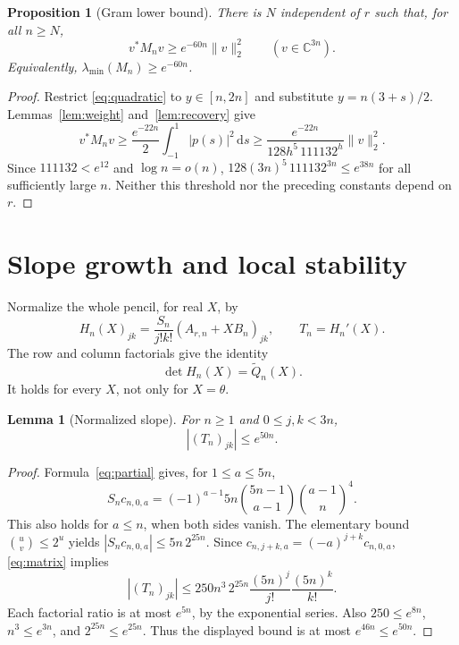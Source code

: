 \documentclass[11pt]{article}
\newtheorem{lemma}[theorem]{Lemma}
\newtheorem{proposition}[theorem]{Proposition}
\numberwithin{equation}{section}
\newcommand{\C}{\mathbb C}
\newcommand{\dd}{\,\mathrm d}
\begin{document}
\begin{proposition}[Gram lower bound]\label{prop:conditioning}
There is $N$ independent of $r$ such that, for all $n\geq N$,
\begin{equation}\label{eq:conditioning}
                     v^*M_nv\geq e^{-60n}\|v\|_2^2
                     \qquad(v\in\C^{3n}).
\end{equation}
Equivalently, $\lambda_{\min}(M_n)\geq e^{-60n}$.
\end{proposition}
\begin{proof}
Restrict \eqref{eq:quadratic} to $y\in[n,2n]$ and substitute
$y=n(3+s)/2$. Lemmas~\ref{lem:weight} and~\ref{lem:recovery} give
\[
 v^*M_nv\geq\frac{e^{-22n}}2\int_{-1}^1|p(s)|^2\dd s
          \geq\frac{e^{-22n}}{128h^5\,111132^h}\|v\|_2^2.
\]
Since $111132<e^{12}$ and $\log n=o(n)$,
$128(3n)^5\,111132^{3n}\leq e^{38n}$ for all sufficiently large $n$.
Neither this threshold nor the preceding constants depend on $r$.
\end{proof}

\section{Slope growth and local stability}\label{sec:stability}

Normalize the whole pencil, for real $X$, by
\[
 H_n(X)_{jk}=\frac{S_n}{j!k!}(A_{r,n}+XB_n)_{jk},\qquad
 T_n=H_n'(X).
\]
The row and column factorials give the identity
\begin{equation}\label{eq:pencil}
                         \det H_n(X)=\widetilde Q_n(X).
\end{equation}
It holds for every $X$, not only for $X=\theta$.

\begin{lemma}[Normalized slope]\label{lem:slope}
For $n\geq1$ and $0\leq j,k<3n$,
\[
                              |(T_n)_{jk}|\leq e^{50n}.
\]
\end{lemma}
\begin{proof}
Formula~\eqref{eq:partial} gives, for $1\leq a\leq5n$,
\[
 S_nc_{n,0,a}=(-1)^{a-1}5n
                  \binom{5n-1}{a-1}\binom{a-1}{n}^{\!4}.
\]
This also holds for $a\leq n$, when both sides vanish. The elementary
bound $\binom uv\leq2^u$ yields $|S_nc_{n,0,a}|\leq5n\,2^{25n}$.
Since $c_{n,j+k,a}=(-a)^{j+k}c_{n,0,a}$, \eqref{eq:matrix} implies
\[
 |(T_n)_{jk}|\leq250n^3\,2^{25n}
                          \frac{(5n)^j}{j!}\frac{(5n)^k}{k!}.
\]
Each factorial ratio is at most $e^{5n}$, by the exponential series.
Also $250\leq e^{8n}$, $n^3\leq e^{3n}$, and $2^{25n}\leq e^{25n}$.
Thus the displayed bound is at most $e^{46n}\leq e^{50n}$.
\end{proof}
\end{document}

